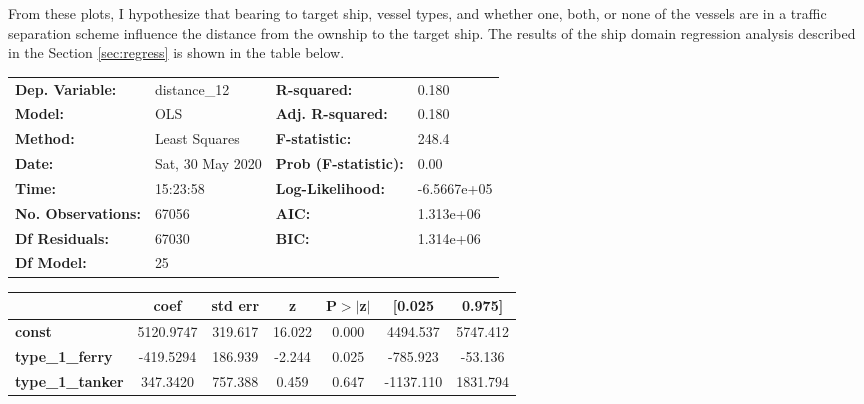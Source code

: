 \documentclass[twoside,symmetric,notoc]{tufte-book}
\begin{document}
\par{%
From these plots, I hypothesize that bearing to target ship, vessel types, and whether one, both, or none of the vessels are in a traffic separation scheme influence the distance from the ownship to the target ship. The results of the ship domain regression analysis described in the Section \ref{sec:regress} is shown in the table below.
\vspace{0.1in}
\begin{fullwidth}
\begin{center}
\begin{tabular}{llll}
\toprule
\textbf{Dep. Variable:}       &   distance\_12   & \textbf{  R-squared:         } &      0.180   \\
\textbf{Model:}               &       OLS        & \textbf{  Adj. R-squared:    } &      0.180   \\
\textbf{Method:}              &  Least Squares   & \textbf{  F-statistic:       } &      248.4   \\
\textbf{Date:}                & Sat, 30 May 2020 & \textbf{  Prob (F-statistic):} &      0.00    \\
\textbf{Time:}                &     15:23:58     & \textbf{  Log-Likelihood:    } & -6.5667e+05  \\
\textbf{No. Observations:}    &       67056      & \textbf{  AIC:               } &  1.313e+06   \\
\textbf{Df Residuals:}        &       67030      & \textbf{  BIC:               } &  1.314e+06   \\
\textbf{Df Model:}            &          25      & \textbf{                     } &              \\
\bottomrule
\end{tabular}
\begin{tabular}{lcccccc}
                              & \textbf{coef} & \textbf{std err} & \textbf{z} & \textbf{P$> |$z$|$} & \textbf{[0.025} & \textbf{0.975]}  \\
\midrule
\textbf{const}                &    5120.9747  &      319.617     &    16.022  &         0.000        &     4494.537    &     5747.412     \\
\textbf{type\_1\_ferry}       &    -419.5294  &      186.939     &    -2.244  &         0.025        &     -785.923    &      -53.136     \\
\textbf{type\_1\_tanker}      &     347.3420  &      757.388     &     0.459  &         0.647        &    -1137.110    &     1831.794     \\

\end{tabular}
\end{center}
\end{fullwidth}}
\end{document}
